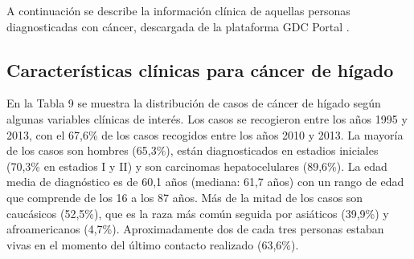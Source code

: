 A continuación se describe la información clínica de aquellas personas diagnosticadas con cáncer, descargada de la plataforma GDC Portal \cite{GDCPortal}. 

\subsection{Características clínicas para cáncer de hígado}

En la Tabla 9 se muestra  la distribución de casos de cáncer de hígado según algunas variables clínicas de interés. Los casos se recogieron entre los años 1995 y 2013, con el 67,6\% de los casos recogidos entre los años 2010 y 2013. La mayoría de los casos son hombres (65,3\%), están diagnosticados en estadios iniciales (70,3\% en estadios I y II) y son carcinomas hepatocelulares (89,6\%). La edad media de diagnóstico es de 60,1 años (mediana: 61,7 años) con un rango de edad que comprende de los 16 a los 87 años. Más de la mitad de los casos son caucásicos (52,5\%), que es la raza más común seguida por asiáticos (39,9\%) y afroamericanos (4,7\%). Aproximadamente dos de cada tres personas estaban vivas en el momento del último contacto realizado (63,6\%).

